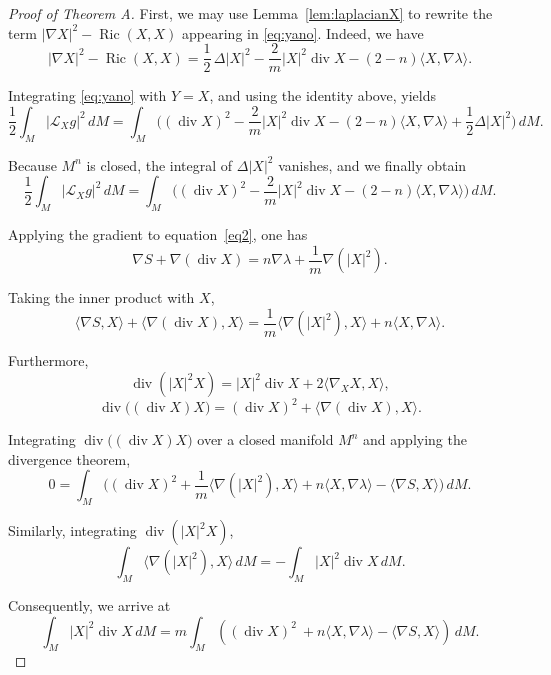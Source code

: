 \documentclass[a4paper, 12pt]{amsart}
\theoremstyle{definition}
\numberwithin{figure}{section}
\begin{document}
\begin{proof}[Proof of Theorem A]

First, we may use Lemma~\ref{lem:laplacianX} to rewrite
the term $|\nabla X|^{2}-\operatorname{Ric}(X,X)$ appearing in \eqref{eq:yano}.
Indeed, we have
$$
|\nabla X|^{2}-\operatorname{Ric}(X,X)
=
\frac{1}{2}\,\Delta |X|^{2}
-\frac{2}{m}|X|^{2}\operatorname{div}X
-(2-n)\langle X,\nabla\lambda\rangle .
$$

Integrating \eqref{eq:yano} with \(Y=X\), and using the identity above, yields
$$
\frac{1}{2}\int_M |\mathcal{L}_X g|^{2}\,dM
=
\int_M \Big(
(\operatorname{div}X)^{2}
-\frac{2}{m}|X|^{2}\operatorname{div}X
-(2-n)\langle X,\nabla\lambda\rangle
+\frac{1}{2}\Delta |X|^{2}
\Big)\,dM .
$$

Because $M^n$ is closed, the integral of $\Delta |X|^{2}$ vanishes, and we finally obtain
\begin{equation}\label{eq27.2}
\frac{1}{2}\int_M |\mathcal{L}_X g|^{2}\,dM
=
\int_M \Big(
(\operatorname{div}X)^{2}
-\frac{2}{m}|X|^{2}\operatorname{div}X
-(2-n)\langle X,\nabla\lambda\rangle
\Big)\,dM .
\end{equation}

Applying the gradient to equation~\eqref{eq2}, one has
$$
\nabla S+\nabla(\operatorname{div}X)
=n\nabla\lambda +\frac{1}{m}\nabla(|X|^{2}).
$$

Taking the inner product with \(X\),
$$
\langle\nabla S, X\rangle
+\langle\nabla(\operatorname{div}X),X\rangle
=\frac{1}{m}\langle\nabla(|X|^{2}),X\rangle
+n\langle X,\nabla\lambda\rangle.
$$

Furthermore,
$$
\operatorname{div}(|X|^{2}X)
=|X|^{2}\operatorname{div}X
+2\langle\nabla_{X}X,X\rangle,
$$
$$
\operatorname{div}\big((\operatorname{div}X)X\big)
=(\operatorname{div}X)^{2}
+\langle\nabla(\operatorname{div}X),X\rangle.
$$

Integrating $\operatorname{div}\big((\operatorname{div}X)X\big)$ over a closed manifold
$M^n$ and applying the divergence theorem,
$$
0=\int_M \Big(
(\operatorname{div}X)^{2}
+\frac{1}{m}\langle\nabla(|X|^{2}),X\rangle
+n\langle X,\nabla\lambda\rangle-\langle\nabla S, X\rangle 
\Big)\,dM .
$$

Similarly, integrating \(\operatorname{div}(|X|^{2}X)\),
$$
\int_M \langle\nabla(|X|^{2}),X\rangle\,dM
=-\int_M |X|^{2}\operatorname{div}X\,dM .
$$

Consequently, we arrive at
\begin{equation}\label{eq27}
\int_M |X|^{2}\operatorname{div}X\,dM
=
m\int_M ((\operatorname{div}X)^{2}\
+n\langle X,\nabla\lambda\rangle-\langle\nabla S, X\rangle)\,dM .
\end{equation}



\end{proof}
\end{document}
